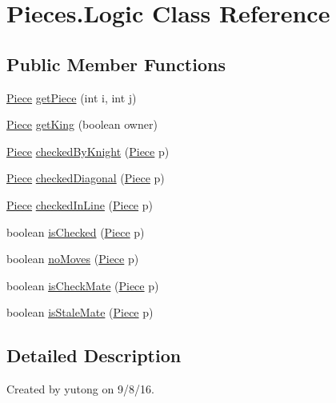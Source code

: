 \hypertarget{classPieces_1_1Logic}{\section{Pieces.\-Logic Class Reference}
\label{classPieces_1_1Logic}
}
\subsection*{Public Member Functions}
\begin{DoxyCompactItemize}
\item 
\hyperlink{classPieces_1_1Piece}{Piece} \hyperlink{classPieces_1_1Logic_a8b2c1f370c82d9639758c409ea8d9d79}{get\-Piece} (int i, int j)
\item 
\hyperlink{classPieces_1_1Piece}{Piece} \hyperlink{classPieces_1_1Logic_ad83f352abf092e2740ab495d65a97ae9}{get\-King} (boolean owner)
\item 
\hyperlink{classPieces_1_1Piece}{Piece} \hyperlink{classPieces_1_1Logic_aec1ccc44beb7de53fd9077469feff9e8}{checked\-By\-Knight} (\hyperlink{classPieces_1_1Piece}{Piece} p)
\item 
\hyperlink{classPieces_1_1Piece}{Piece} \hyperlink{classPieces_1_1Logic_af1d641f37da06c3e45b5a6bee9a6525b}{checked\-Diagonal} (\hyperlink{classPieces_1_1Piece}{Piece} p)
\item 
\hyperlink{classPieces_1_1Piece}{Piece} \hyperlink{classPieces_1_1Logic_ac0bb52cd90a0dd7cacc10521eb2e57f8}{checked\-In\-Line} (\hyperlink{classPieces_1_1Piece}{Piece} p)
\item 
boolean \hyperlink{classPieces_1_1Logic_aaf2761d9be4c7aba979922d5919bea28}{is\-Checked} (\hyperlink{classPieces_1_1Piece}{Piece} p)
\item 
boolean \hyperlink{classPieces_1_1Logic_aaeeb3da7c87dc40646df2b3f1b4bc50e}{no\-Moves} (\hyperlink{classPieces_1_1Piece}{Piece} p)
\item 
boolean \hyperlink{classPieces_1_1Logic_a876ca4b44bc7042fd633f1545e46013a}{is\-Check\-Mate} (\hyperlink{classPieces_1_1Piece}{Piece} p)
\item 
boolean \hyperlink{classPieces_1_1Logic_a9d339891130cff2940891cdf85a0f248}{is\-Stale\-Mate} (\hyperlink{classPieces_1_1Piece}{Piece} p)
\end{DoxyCompactItemize}


\subsection{Detailed Description}
Created by yutong on 9/8/16. 

